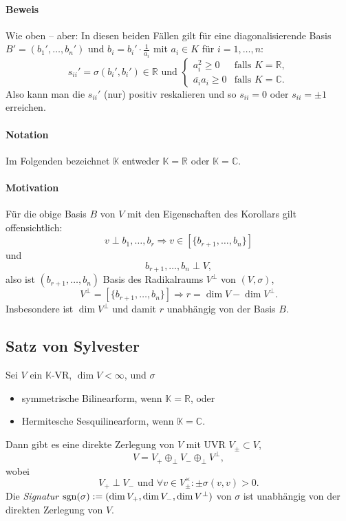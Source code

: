 \paragraph{Beweis}
	Wie oben -- aber:
	In diesen beiden Fällen gilt für eine diagonalisierende Basis $ B'=(b_1',\dots,b_n') $ und $ b_i = b_i'\cdot \frac{1}{a_i} $ mit $ a_i\in K $ für $ i=1,\dots,n $:
		\[ s_{ii}' = \sigma(b_i',b_i')\in \mathbb{R} \text{ und }
		\begin{cases}
			a_i^2 \geq 0 & \text{falls } K = \mathbb{R},\\
			\overline{a_i}a_i \geq 0 & \text{falls } K =\mathbb{C}.
		\end{cases} \]
	Also kann man die $ s_{ii}' $ (nur) positiv reskalieren und so $ s_{ii} = 0 $ oder $ s_{ii} = \pm 1 $ erreichen.
\paragraph{Notation}
	Im Folgenden bezeichnet $ \mathbb{K} $ entweder $ \mathbb{K} = \mathbb{R} $ oder $ \mathbb{K}=\mathbb{C} $.
\paragraph{Motivation}
	Für die obige Basis $ B $ von $ V $ mit den Eigenschaften des Korollars gilt offensichtlich:
		\[ v\perp b_1,\dots,b_r \Rightarrow v\in [\{b_{r+1},\dots,b_{n}\}] \]
	und
		\[ b_{r+1},\dots,b_n \perp V, \]
	also ist $ (b_{r+1},\dots,b_n) $ Basis des Radikalraums $ V^\perp $ von $ (V,\sigma) $,
		\[ V^\perp = [\{b_{r+1},\dots,b_n\} ] \Rightarrow r = \dim V-\dim V^\perp. \]
	Insbesondere ist $ \dim V^\perp $ und damit $ r $ unabhängig von der Basis $ B $.

\subsection{Satz von Sylvester}
	Sei $ V $ ein $ \mathbb{K} $-VR, $ \dim V <\infty $, und $ \sigma $
		\begin{itemize}
			\item symmetrische Bilinearform, wenn $ \mathbb{K}=\mathbb{R} $, oder
			\item Hermitesche Sesquilinearform, wenn $ \mathbb{K}=\mathbb{C} $.
		\end{itemize}
	Dann gibt es eine direkte Zerlegung von $ V $ mit UVR $ V_{\pm}\subset V $,
		\[ V= V_+ \oplus_\perp V_- \oplus_\perp V^\perp,  \]
	wobei
		\[ V_+ \perp V_- \text{ und } \forall v\in V^\times_\pm: \pm \sigma(v,v) > 0. \]
	Die \emph{Signatur} $ \operatorname{sgn}(\sigma):= (\dim V_+,\dim V_-,\dim V^\perp) $ von $ \sigma $ ist unabhängig von der direkten Zerlegung von $ V $.
